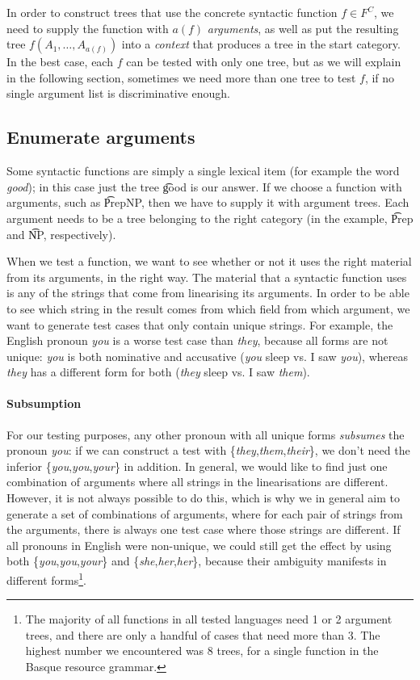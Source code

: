 In order to construct trees that use the concrete syntactic function
$f \in F^C$, we need to supply the function with
$a(f)$ \emph{arguments}, as well as put the resulting tree $f
(A_1,\ldots,A_{a(f)})$ into a \emph{context} that produces a tree in
the start category.  In the best case, each $f$ can be tested with
only one tree, but as we will explain in the following section,
sometimes we need more than one tree to test $f$, if no single
argument list is discriminative enough.


\subsection{Enumerate arguments}
\label{enumerate-arguments}
Some syntactic functions are simply a single lexical item (for example
the word \emph{good}); in this case just the tree \t{good} is our
answer.  If we choose a function with arguments, such as \t{PrepNP},
then we have to supply it with argument trees. Each argument needs to
be a tree belonging to the right category (in the example, \t{Prep}
and \t{NP}, respectively).

When we test a function, we want to see whether or not it uses the
right material from its arguments, in the right way. The
material that a syntactic function uses is any of the strings that
come from linearising its arguments. In order to be able to see which
string in the result comes from which field from which argument, we
want to generate test cases that only contain unique strings.  For
example, the English pronoun {\em you} is a worse test case than {\em
  they}, because all forms are not unique: {\em you} is both
nominative and accusative ({\em you} sleep vs. I saw {\em you}),
whereas {\em they} has a different form for both ({\em they} sleep
vs. I saw {\em them}).


\paragraph{Subsumption} For our testing purposes, any other pronoun
with all unique forms \emph{subsumes} the pronoun {\em you}: if we can
construct a test with \{{\em they},{\em them},{\em their}\}, we don't
need the inferior \{{\em you},{\em you},{\em your}\} in addition. In
general, we would like to find just one combination of arguments where
all strings in the linearisations are different. However, it is not
always possible to do this, which is why we in general aim to generate
a set of combinations of arguments, where for each pair of strings
from the arguments, there is always one test case where those strings
are different. If all pronouns in English were non-unique, we could
still get the effect by using both \{{\em you},{\em you},{\em your}\}
and \{{\em she},{\em her},{\em her}\}, because their ambiguity
manifests in different forms\footnote{The majority of all functions in all tested languages need 1 or
2 argument trees, and there are only a handful of cases that need more
than 3. The highest number we encountered was 8 trees, for a single
function in the Basque resource grammar.}.

